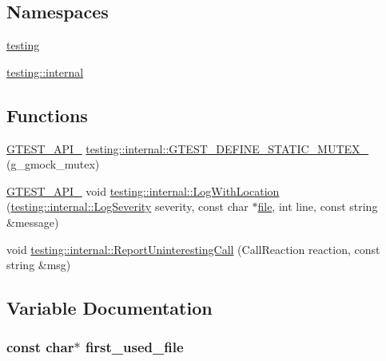 \subsection*{Namespaces}
\begin{DoxyCompactItemize}
\item 
 \hyperlink{namespacetesting}{testing}
\item 
 \hyperlink{namespacetesting_1_1internal}{testing\+::internal}
\end{DoxyCompactItemize}
\subsection*{Functions}
\begin{DoxyCompactItemize}
\item 
\hyperlink{gtest-port_8h_aa73be6f0ba4a7456180a94904ce17790}{G\+T\+E\+S\+T\+\_\+\+A\+P\+I\+\_\+} \hyperlink{namespacetesting_1_1internal_a8c4aa7be8daa7b60e293071d70a89584}{testing\+::internal\+::\+G\+T\+E\+S\+T\+\_\+\+D\+E\+F\+I\+N\+E\+\_\+\+S\+T\+A\+T\+I\+C\+\_\+\+M\+U\+T\+E\+X\+\_\+} (g\+\_\+gmock\+\_\+mutex)
\item 
\hyperlink{gtest-port_8h_aa73be6f0ba4a7456180a94904ce17790}{G\+T\+E\+S\+T\+\_\+\+A\+P\+I\+\_\+} void \hyperlink{namespacetesting_1_1internal_af271cd1fc0b62a7f4736cb3109e86a37}{testing\+::internal\+::\+Log\+With\+Location} (\hyperlink{namespacetesting_1_1internal_a203d1a8a2147a53d12bbdae40d443914}{testing\+::internal\+::\+Log\+Severity} severity, const char $\ast$\hyperlink{_07copy_08_2_read_camera_model_8m_a151631b2fd2bb776ef06c9f440a7ed74}{file}, int line, const string \&message)
\item 
void \hyperlink{namespacetesting_1_1internal_a8d99a1e87d0cea563b2bfad8a4e65276}{testing\+::internal\+::\+Report\+Uninteresting\+Call} (Call\+Reaction reaction, const string \&msg)
\end{DoxyCompactItemize}


\subsection{Variable Documentation}
\subsubsection[{\texorpdfstring{first\+\_\+used\+\_\+file}{first_used_file}}]{\setlength{\rightskip}{0pt plus 5cm}const char$\ast$ first\+\_\+used\+\_\+file}\hypertarget{gmock-spec-builders_8cc_a8eedfa563d9488da77e2972262a6adda}{}\label{gmock-spec-builders_8cc_a8eedfa563d9488da77e2972262a6adda}
